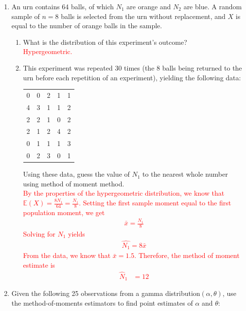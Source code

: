 \documentclass[12pt]{article} %
\begin{document}
\begin{enumerate}
\newpage
\item An urn contains 64 balls, of which $N_1$ are orange and $N_2$ are blue. A random sample of $n=8$ balls is selected from the urn without replacement, and $X$ is equal to the number of orange balls in the sample. 
\begin{enumerate}[label=7.\arabic*]
\item What is the distribution of this experiment's outcome? \\ \textcolor{red}{Hypergeometric.}
\item This experiment was repeated 30 times (the 8 balls being returned to the urn before each repetition of an experiment), yielding the following data:
\begin{center}
\begin{tabular}{c c c c c} 
0& 0& 2& 1& 1\\
4& 3& 1& 1& 2 \\
2& 2& 1& 0& 2\\
2& 1& 2& 4& 2\\
0& 1& 1& 1& 3\\
0& 2& 3& 0& 1
\end{tabular}
\end{center}
Using these data, guess the value of $N_1$ to the nearest whole number using method of moment method. \\ 
\textcolor{red}{By the properties of the hypergeometric distribution, we know that $\mathbb{E}(X) = \frac{8N_1}{64} = \frac{N_1}{8}$. Setting the first sample moment equal to the first population moment, we get $$\begin{aligned}
    \bar{x} = \frac{N_1}{8}
\end{aligned}$$ Solving for $N_1$ yields $$\begin{aligned}
    \hat{N_1} = 8 \bar{x}
\end{aligned}$$ From the data, we know that $\bar{x} = 1.5$. Therefore, the method of moment estimate is $$\begin{aligned}
    \hat N_1 &= 12
\end{aligned}$$}
\end{enumerate}
\newpage
\item Given the following 25 observations from a
gamma distribution$(\alpha, \theta)$, use the method-of-moments estimators to find point estimates of $\alpha$ and $\theta$:


\end{enumerate}
\end{document}
